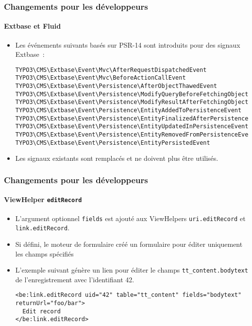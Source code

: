 \begin{frame}[fragile]
	\frametitle{Changements pour les développeurs}
	\framesubtitle{Extbase et Fluid}

	\lstset{basicstyle=\tiny\ttfamily}

	\begin{itemize}
		\item Les événements suivants basés sur PSR-14 sont introduits pour des signaux Extbase~:

\vspace{-0.4cm}
\begin{lstlisting}
TYPO3\CMS\Extbase\Event\Mvc\AfterRequestDispatchedEvent
TYPO3\CMS\Extbase\Event\Mvc\BeforeActionCallEvent
TYPO3\CMS\Extbase\Event\Persistence\AfterObjectThawedEvent
TYPO3\CMS\Extbase\Event\Persistence\ModifyQueryBeforeFetchingObjectDataEvent
TYPO3\CMS\Extbase\Event\Persistence\ModifyResultAfterFetchingObjectDataEvent
TYPO3\CMS\Extbase\Event\Persistence\EntityAddedToPersistenceEvent
TYPO3\CMS\Extbase\Event\Persistence\EntityFinalizedAfterPersistenceEvent
TYPO3\CMS\Extbase\Event\Persistence\EntityUpdatedInPersistenceEvent
TYPO3\CMS\Extbase\Event\Persistence\EntityRemovedFromPersistenceEvent
TYPO3\CMS\Extbase\Event\Persistence\EntityPersistedEvent
\end{lstlisting}

		\item Les signaux existants sont remplacés et ne doivent plus être utilisés.

	\end{itemize}

\end{frame}


\begin{frame}[fragile]
	\frametitle{Changements pour les développeurs}
	\framesubtitle{ViewHelper \texttt{editRecord}}

	\lstset{basicstyle=\tiny\ttfamily}

	\begin{itemize}
		\item L'argument optionnel \texttt{fields} est ajouté aux ViewHelpers
			\texttt{uri.editRecord} et \texttt{link.editRecord}.
		\item Si défini, le moteur de formulaire créé un formulaire pour éditer
			uniquement les champs spécifiés
		\item L'exemple suivant génère un lien pour éditer le champs \texttt{tt\_content.bodytext}
			de l'enregistrement avec l'identifiant 42.

\begin{lstlisting}
<be:link.editRecord uid="42" table="tt_content" fields="bodytext" returnUrl="foo/bar">
  Edit record
</be:link.editRecord>
\end{lstlisting}

	\end{itemize}

\end{frame}

